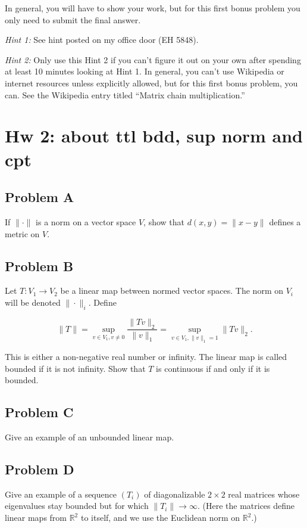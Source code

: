 \documentclass[lang=cn,11pt]{template}
\begin{document}
In general, you will have to show your work, but for this first bonus problem you only need to submit the final answer.

\textit{Hint 1:} See hint posted on my office door (EH 5848).

\textit{Hint 2:} Only use this Hint 2 if you can’t figure it out on your own after spending at least 10 minutes looking at Hint 1. In general, you can’t use Wikipedia or internet resources unless explicitly allowed, but for this first bonus problem, you can. See the Wikipedia entry titled “Matrix chain multiplication.”





\chapter*{Hw 2: about ttl bdd, sup norm and cpt}

\section*{Problem A}
If \( \|\cdot\| \) is a norm on a vector space \( V \), show that \( d(x, y) = \|x - y\| \) defines a metric on \( V \).

\section*{Problem B}
Let \( T: V_1 \to V_2 \) be a linear map between normed vector spaces. The norm on \( V_i \) will be denoted \( \|\cdot\|_i \). Define

\[
\|T\| = \sup_{v \in V_1, v \neq 0} \frac{\|T v\|_2}{\|v\|_1} = \sup_{v \in V_1, \|v\|_1 = 1} \|T v\|_2.
\]

This is either a non-negative real number or infinity. The linear map is called bounded if it is not infinity. Show that \( T \) is continuous if and only if it is bounded.

\section*{Problem C}
Give an example of an unbounded linear map.

\section*{Problem D}
Give an example of a sequence \( (T_i) \) of diagonalizable \( 2 \times 2 \) real matrices whose eigenvalues stay bounded but for which \( \|T_i\| \to \infty \). (Here the matrices define linear maps from \( \mathbb{R}^2 \) to itself, and we use the Euclidean norm on \( \mathbb{R}^2 \).)
\end{document}

